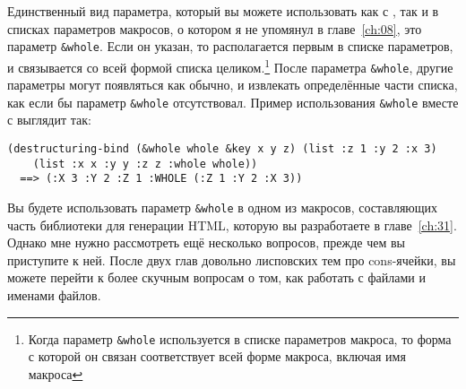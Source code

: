 Единственный вид параметра, который вы можете использовать как с
, так и в списках параметров макросов, о котором я не упомянул в
главе~\ref{ch:08}, это параметр \lstinline!&whole!. Если он указан, то располагается
первым в списке параметров, и связывается со всей формой списка целиком.\footnote{Когда
  параметр \lstinline!&whole! используется в списке параметров макроса, то форма с которой
  он связан соответствует всей форме макроса, включая имя макроса} После параметра
\lstinline!&whole!, другие параметры могут появляться как обычно, и извлекать определённые
части списка, как если бы параметр \lstinline!&whole! отсутствовал. Пример использования
\lstinline!&whole! вместе с  выглядит так:
  
\begin{lstlisting}[style=lisprepl]
  (destructuring-bind (&whole whole &key x y z) (list :z 1 :y 2 :x 3)
    (list :x x :y y :z z :whole whole))
  ==> (:X 3 :Y 2 :Z 1 :WHOLE (:Z 1 :Y 2 :X 3))
\end{lstlisting}

Вы будете использовать параметр \lstinline!&whole! в одном из макросов, составляющих часть
библиотеки для генерации HTML, которую вы разработаете в главе~\ref{ch:31}.  Однако мне
нужно рассмотреть ещё несколько вопросов, прежде чем вы приступите к ней. После двух глав
довольно лисповских тем про cons-ячейки, вы можете перейти к более скучным вопросам о том,
как работать с файлами и именами файлов.






